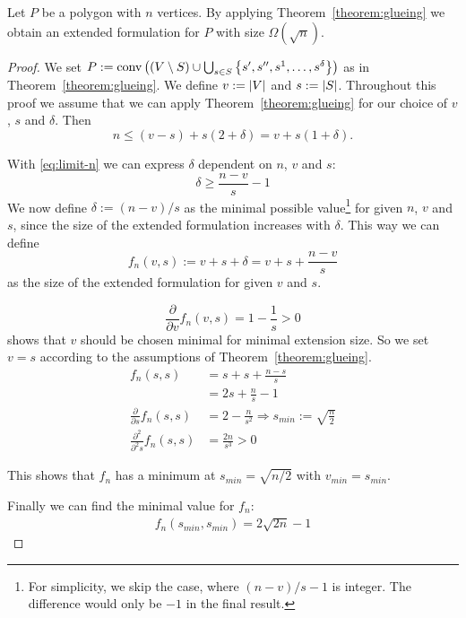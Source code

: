 \begin{observation}\label{observation:limits-of-glueing}
  Let $P$ be a polygon with $n$ vertices. By applying Theorem~\ref{theorem:glueing} we obtain an extended formulation for $P$ with size $\Omega(\sqrt{n})$.
\end{observation}
\begin{proof}
  We set $P := \operatorname{conv}\left( (V \setminus S) \cup \bigcup_{s \in S} \left\{ s',s'',s^1,\dots,s^\delta \right\} \right)$ as in Theorem~\ref{theorem:glueing}. We define $v := \lvert V\rvert$ and $s := \lvert S\rvert$. Throughout this proof we assume that we can apply Theorem~\ref{theorem:glueing} for our choice of $v$, $s$ and $\delta$. Then
  \begin{equation}\label{eq:limit-n}
    n \leq (v-s) + s(2+\delta) = v + s(1+\delta).
  \end{equation}

  With \eqref{eq:limit-n} we can express $\delta$ dependent on $n$, $v$ and $s$:
  \begin{equation*}
    \delta \geq \frac{n-v}{s} - 1
  \end{equation*}
  We now define $\delta := (n-v)/s$ as the minimal possible value\footnote{For simplicity, we skip the case, where $(n-v)/s - 1$ is integer. The difference would only be $-1$ in the final result.} for given $n$, $v$ and $s$, since the size of the extended formulation increases with $\delta$. This way we can define $$f_n(v,s) := v + s + \delta = v + s + \frac{n-v}{s}$$ as the size of the extended formulation for given $v$ and $s$.

  $$\frac{\partial}{\partial v} f_n(v,s) = 1 - \frac{1}{s} > 0$$ shows that $v$ should be chosen minimal for minimal extension size. So we set $v = s$ according to the assumptions of Theorem~\ref{theorem:glueing}.
  \begin{align*}
    f_n(s, s) &= s + s + \frac{n-s}{s} \\
    &= 2s + \frac{n}{s} - 1\\
    \frac{\partial}{\partial s} f_n(s,s) &= 2 - \frac{n}{s^2} \Rightarrow s_{min} := \sqrt{\frac{n}{2}} \\
    \frac{\partial^2}{\partial^2 s} f_n(s,s) &= \frac{2n}{s^3} > 0
  \end{align*}

  This shows that $f_n$ has a minimum at $s_{min} = \sqrt{n/2}$ with $v_{min}=s_{min}$.

  Finally we can find the minimal value for $f_n$:
  \begin{align*}
    f_n(s_{min}, s_{min}) = 2\sqrt{2n} - 1
  \end{align*}
\end{proof}



